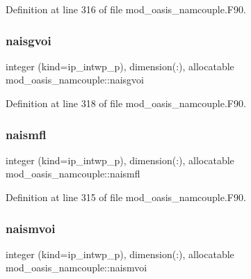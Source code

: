Definition at line 316 of file mod\+\_\+oasis\+\_\+namcouple.\+F90.

\mbox{\label{namespacemod__oasis__namcouple_a87c0bb7c0a2cccbb673dcaf35e3dec50}} 
\subsubsection{\texorpdfstring{naisgvoi}{naisgvoi}}
{\footnotesize\ttfamily integer (kind=ip\+\_\+intwp\+\_\+p), dimension(\+:), allocatable mod\+\_\+oasis\+\_\+namcouple\+::naisgvoi\hspace{0.3cm}{\ttfamily [private]}}



Definition at line 318 of file mod\+\_\+oasis\+\_\+namcouple.\+F90.

\mbox{\label{namespacemod__oasis__namcouple_a4a7cad8814c7811b364fd7d70b60b576}} 
\subsubsection{\texorpdfstring{naismfl}{naismfl}}
{\footnotesize\ttfamily integer (kind=ip\+\_\+intwp\+\_\+p), dimension(\+:), allocatable mod\+\_\+oasis\+\_\+namcouple\+::naismfl\hspace{0.3cm}{\ttfamily [private]}}



Definition at line 315 of file mod\+\_\+oasis\+\_\+namcouple.\+F90.

\mbox{\label{namespacemod__oasis__namcouple_ae3d7c72b2f2f3ece9583cc0b25edbaba}} 
\subsubsection{\texorpdfstring{naismvoi}{naismvoi}}
{\footnotesize\ttfamily integer (kind=ip\+\_\+intwp\+\_\+p), dimension(\+:), allocatable mod\+\_\+oasis\+\_\+namcouple\+::naismvoi\hspace{0.3cm}{\ttfamily [private]}}



